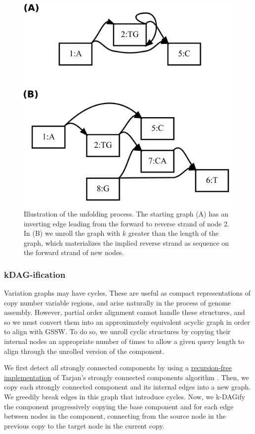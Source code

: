 \documentclass[12pt]{article}
\begin{document}
\begin{figure}[t]
\centering
\includegraphics[width=1.0\textwidth]{figures/unfold}
\caption{\label{fig:unfold}
  Illustration of the unfolding process. The starting graph (A) has an inverting edge leading from the forward to reverse strand of node 2.
  In (B) we unroll the graph with $k$ greater than the length of the graph, which materializes the implied reverse strand as sequence on the forward strand of new nodes.
}
\end{figure}

\subsubsection{kDAG-ification}

Variation graphs may have cycles.
These are useful as compact representations of copy number variable regions, and arise naturally in the process of genome assembly.
However, partial order alignment cannot handle these structures, and so we must convert them into an approximately equivalent acyclic graph in order to align with GSSW.
To do so, we unroll cyclic structures by copying their internal nodes an appropriate number of times to allow a given query length to align through the unrolled version of the component.

We first detect all strongly connected components by using a \href{https://github.com/vgteam/vg/blob/fbcb6e62/src/vg.cpp#L3508-L3552}{recursion-free implementation} of Tarjan's strongly connected components algorithm \cite{tarjan1972depth}.
Then, we copy each strongly connected component and its internal edges into a new graph.
We greedily break edges in this graph that introduce cycles.
Now, we k-DAGify the component progressively copying the base component and for each edge between nodes in the component, connecting from the source node in the previous copy to the target node in the current copy.
\end{document}
